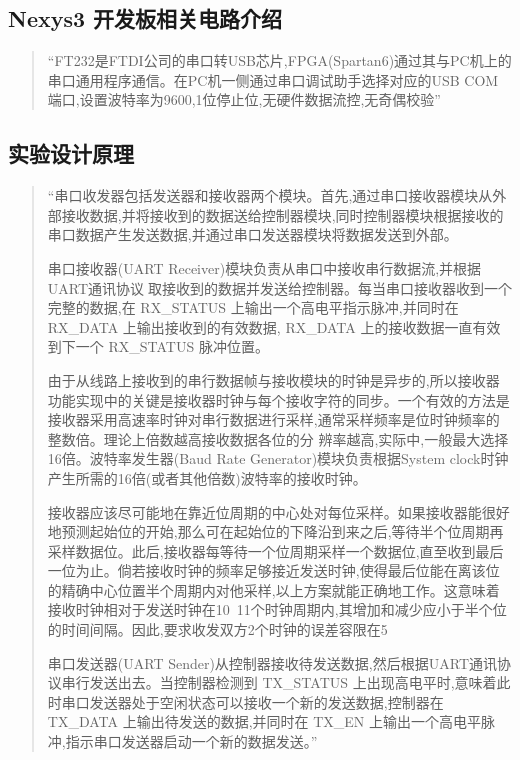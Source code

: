 \documentclass[11pt,a4paper]{article}
\begin{document}
\subsection{Nexys3 开发板相关电路介绍}
\begin{quotation}
  “FT232是FTDI公司的串口转USB芯片,FPGA(Spartan6)通过其与PC机上的串口通用程序通信。在PC机一侧通过串口调试助手选择对应的USB COM端口,设置波特率为9600,1位停止位,无硬件数据流控,无奇偶校验”
\end{quotation}

\subsection{实验设计原理}
\begin{quotation}
  “串口收发器包括发送器和接收器两个模块。首先,通过串口接收器模块从外部接收数据,并将接收到的数据送给控制器模块,同时控制器模块根据接收的串口数据产生发送数据,并通过串口发送器模块将数据发送到外部。

  串口接收器(UART Receiver)模块负责从串口中接收串行数据流,并根据UART通讯协议􏰂取接收到的数据并发送给控制器。每当串口接收器收到一个完整的数据,在 RX\_STATUS 上输出一个高电平指示脉冲,并同时在 RX\_DATA 上输出接收到的有效数据, RX\_DATA 上的接收数据一直有效到下一个 RX\_STATUS 脉冲位置。

  由于从线路上接收到的串行数据帧与接收模块的时钟是异步的,所以接收器功能实现中的关键是接收器时钟与每个接收字符的同步。一个有效的方法是接收器采用高速率时钟对串行数据进行采样,通常采样频率是位时钟频率的整数倍。理论上倍数越高接收数据各位的分
  辨率越高,实际中,一般最大选择16倍。波特率发生器(Baud Rate Generator)模块负责根据System clock时钟产生所需的16倍(或者其他倍数)波特率的接收时钟。

  接收器应该尽可能地在靠近位周期的中心处对每位采样。如果接收器能很好地预测起始位的开始,那么可在起始位的下降沿到来之后,等待半个位周期再采样数据位。此后,接收器每等待一个位周期采样一个数据位,直至收到最后一位为止。倘若接收时钟的频率足够接近发送时钟,使得最后位能在离该位的精确中心位置半个周期内对他采样,以上方案就能正确地工作。这意味着接收时钟相对于发送时钟在10~11个时钟周期内,其增加和减少应小于半个位的时间间隔。因此,要求收发双方2个时钟的误差容限在5%

  串口发送器(UART Sender)从控制器接收待发送数据,然后根据UART通讯协议串行发送出去。当控制器检测到 TX\_STATUS 上出现高电平时,意味着此时串口发送器处于空闲状态可以接收一个新的发送数据,控制器在 TX\_DATA 上输出待发送的数据,并同时在 TX\_EN 上输出一个高电平脉冲,指示串口发送器启动一个新的数据发送。”
\end{quotation}
\end{document}
